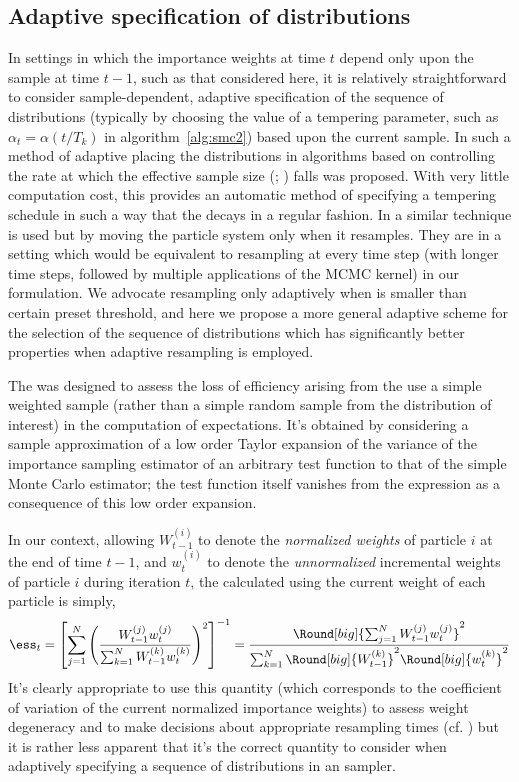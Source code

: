 \subsection{Adaptive specification of distributions}
\label{sub:Adaptive specification of distributions}

In settings in which the importance weights at time $t$ depend only upon the
sample at time $t-1$, such as that considered here, it is relatively
straightforward to consider sample-dependent, adaptive specification of the
sequence of distributions (typically by choosing the value of a tempering
parameter, such as $\alpha_t = \alpha(t/T_k)$ in algorithm~\ref{alg:smc2})
based upon the current sample. In \cite{Jasra:2010eh} such a method of
adaptive placing the distributions in \smc algorithms based on controlling the
rate at which the effective sample size (\ess; \cite{Kong:1994ul}) falls was
proposed. With very little computation cost, this provides an automatic method
of specifying a tempering schedule in such a way that the \ess decays in a
regular fashion. In \cite[Algorithm 2]{Schafer:2011bx} a similar technique is
used but by moving the particle system only when it resamples. They are in a
setting which would be equivalent to resampling at every time step (with
longer time steps, followed by multiple applications of the MCMC kernel) in
our formulation. We advocate resampling only adaptively when \ess is smaller
than certain preset threshold, and here we propose a more general adaptive
scheme for the selection of the sequence of distributions which has
significantly better properties when adaptive resampling is employed.

The \ess was designed to assess the loss of efficiency arising from the use a
simple weighted sample (rather than a simple random sample from the
distribution of interest) in the computation of expectations. It's obtained by
considering a sample approximation of a low order Taylor expansion of the
variance of the importance sampling estimator of an arbitrary test function to
that of the simple Monte Carlo estimator; the test function itself vanishes
from the expression as a consequence of this low order expansion.

In our context, allowing $W_{t-1}^{(i)}$ to denote the \emph{normalized
  weights} of particle $i$ at the end of time $t - 1$, and $w_t^{(i)}$ to
denote the \emph{unnormalized} incremental weights of particle $i$ during
iteration $t$, the \ess calculated using the current weight of each particle
is simply,
\begin{equation}
  \ess_t = \left[ {\sum_{j=1}^N\left( \frac{W_{t-1}^{(j)}
          w_t^{(j)}}{\sum_{k=1}^NW_{t-1}^{(k)}w_t^{(k)}}\right)^2}
  \right]^{-1} = \frac{\Round[big]{\sum_{j=1}^NW_{t-1}^{(j)}w_t^{(j)}}^2}
  {\sum_{k=1}^N\Round[big]{W_{t-1}^{(k)}}^2\Round[big]{w_t^{(k)}}^2}
\end{equation}
It's clearly appropriate to use this quantity (which corresponds to the
coefficient of variation of the current normalized importance weights) to
assess weight degeneracy and to make decisions about appropriate resampling
times (cf. \cite{DelMoral:2012jq}) but it is rather less apparent that it's
the correct quantity to consider when adaptively specifying a sequence of
distributions in an \smc sampler.

